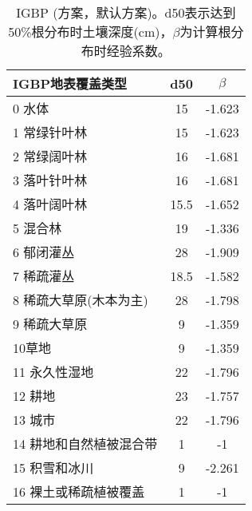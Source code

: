 \begin{table}[htbp]
    \centering
    \caption{IGBP (\citet{schenk2002rooting}方案，默认方案)。d50表示达到50\%根分布时土壤深度(cm)，$\beta$为计算根分布时经验系数。}
    \label{tab:IGBPSchenkANDJackson2002方案默认方案}
    \begin{tabular}{@{}lcc@{}}
    \toprule
    IGBP地表覆盖类型     & d50  & $\beta$ \\ \midrule
    0 水体          & 15   & -1.623 \\  
    1 常绿针叶林       & 15   & -1.623 \\
    2 常绿阔叶林       & 16   & -1.681 \\
    3 落叶针叶林       & 16   & -1.681 \\
    4 落叶阔叶林       & 15.5 & -1.652 \\
    5 混合林         & 19   & -1.336 \\
    6 郁闭灌丛        & 28   & -1.909 \\
    7 稀疏灌丛        & 18.5 & -1.582 \\
    8 稀疏大草原(木本为主) & 28   & -1.798 \\
    9 稀疏大草原       & 9    & -1.359 \\
    10草地          & 9    & -1.359 \\
    11 永久性湿地      & 22   & -1.796 \\
    12 耕地         & 23   & -1.757 \\
    13 城市         & 22   & -1.796 \\
    14 耕地和自然植被混合带 & 1    & -1     \\
    15 积雪和冰川      & 9    & -2.261 \\
    16 裸土或稀疏植被覆盖  & 1    & -1     \\ \bottomrule
\end{tabular}
\end{table}



